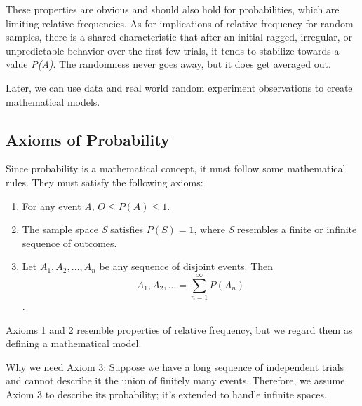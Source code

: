 These properties are obvious and should also hold for probabilities, which are limiting relative frequencies. As for implications of relative frequency for random samples, there is a shared characteristic that after an initial ragged, irregular, or unpredictable behavior over the first few trials, it tends to stabilize towards a value \textit{P(A)}. The randomness never goes away, but it does get averaged out.

Later, we can use data and real world random experiment observations to create mathematical models.

\subsection{Axioms of Probability}
Since probability is a mathematical concept, it must follow some mathematical rules. They must satisfy the following axioms:
\begin{enumerate}
    \item For any event \textit{A}, $O\le P(A)\le1$.
    \item The sample space \textit{S} satisfies $P(S)=1$, where \textit{S} resembles a finite or infinite sequence of outcomes.
    \item Let $A_{1}, A_{2}, \ldots, A_{n}$ be any sequence of disjoint events. Then \[A_{1}, A_{2}, \ldots = \sum_{n=1}^{\infty}P(A_{n})\].
\end{enumerate}

Axioms 1 and 2 resemble properties of relative frequency, but we regard them as defining a mathematical model.

Why we need Axiom 3: Suppose we have a long sequence of independent trials and cannot describe it the union of finitely many events. Therefore, we assume Axiom 3 to describe its probability; it's extended to handle infinite spaces.